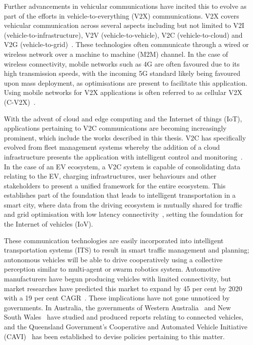 Further advancements in vehicular communications have incited this to evolve as part of the efforts in vehicle-to-everything (V2X) communications. V2X covers vehicular communication across several aspects including but not limited to V2I (vehicle-to-infrastructure), V2V (vehicle-to-vehicle), V2C (vehicle-to-cloud) and V2G (vehicle-to-grid)~\cite{pearre_review_2019}. These technologies often communicate through a wired or wireless network over a machine to machine (M2M) channel. In the case of wireless connectivity, mobile networks such as 4G are often favoured due to its high transmission speeds, with the incoming 5G standard likely being favoured upon mass deployment, as optimisations are present to facilitate this application. Using mobile networks for V2X applications is often referred to as cellular V2X (C-V2X)~\cite{papathanassiou_cellular_2017}.

With the advent of cloud and edge computing and the Internet of things (IoT), applications pertaining to V2C communications are becoming increasingly prominent, which include the works described in this thesis. V2C has specifically evolved from fleet management systems whereby the addition of a cloud infrastructure presents the application with intelligent control and monitoring~\cite{deng_cooperative_2019}. In the case of an EV ecosystem, a V2C system is capable of consolidating data relating to the EV, charging infrastructures, user behaviours and other stakeholders to present a unified framework for the entire ecosystem. This establishes part of the foundation that leads to intelligent transportation in a smart city, where data from the driving ecosystem is mutually shared for traffic and grid optimisation with low latency connectivity~\cite{hensher_tackling_2018, khattak_toward_2019}, setting the foundation for the Internet of vehicles (IoV).

These communication technologies are easily incorporated into intelligent transportation systems (ITS) to result in smart traffic management and planning; autonomous vehicles will be able to drive cooperatively using a collective perception similar to multi-agent or swarm robotics system. Automotive manufacturers have begun producing vehicles with limited connectivity, but market researches have predicted this market to expand by 45 per cent by 2020 with a 19 per cent CAGR~\cite{market_research_future_connected_2019}. These implications have not gone unnoticed by governments. In Australia, the governments of Western Australia~\cite{weeratunga_connected_2015} and New South Wales~\cite{transport_for_nsw_connected_2018} have studied and produced reports relating to connected vehicles, and the Queensland Government's Cooperative and Automated Vehicle Initiative (CAVI)~\cite{queensland_government_cavi:_2017} has been established to devise policies pertaining to this matter. 

